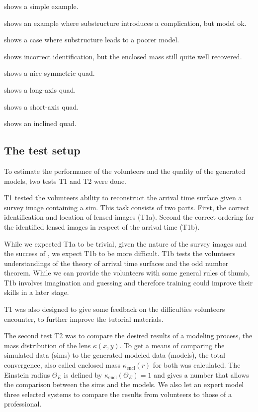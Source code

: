  shows a simple example.

 shows an example where substructure introduces a
complication, but model ok.

 shows a case where substructure leads to a
poorer model.

 shows incorrect identification, but the enclosed
mass still quite well recovered.

 shows a nice symmetric quad.

 shows a long-axis quad.

 shows a short-axis quad.

 shows an inclined quad.


\subsection{The test setup} \label{sec:testsetup}

To estimate the performance of the volunteers and the quality of the generated models, two tests T1 and T2 were done.

T1 tested the volunteers ability to reconstruct the arrival time surface given a survey image containing a sim.
This task consists of two parts.
First, the correct identification and location of lensed images (T1a).
Second the correct ordering for the identified lensed images in respect of the arrival time (T1b).

While we expected T1a to be trivial, given the nature of the survey images and the success of \sw, we expect T1b to be more difficult.
T1b tests the volunteers understandings of the theory of arrival time surfaces and the odd number theorem.
While we can provide the volunteers with some general rules of thumb, T1b involves imagination and guessing and therefore training could improve their skills in a later stage.

T1 was also designed to give some feedback on the difficulties volunteers encounter, to further improve the tutorial materials.

The second test T2 was to compare the desired results of a modeling process, the mass distribution of the lens $\kappa(x, y)$.
To get a means of comparing the simulated data (sims) to the generated modeled data (models), the total convergence, also called enclosed mass $\kappa_{\text{encl}}(r)$ for both was calculated.
The Einstein radius $\Theta_E$ is defined by $\kappa_{\text{encl}}(\Theta_E)=1$ and gives a number that allows the comparison between the sims and the models.
We also let an expert model three selected systems to compare the results from volunteers to those of a professional.

